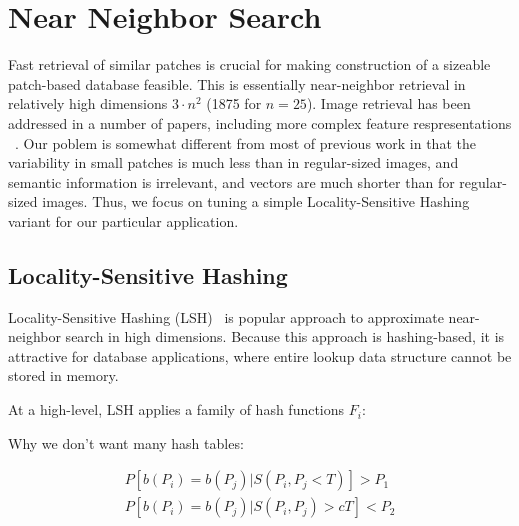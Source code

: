\section{Near Neighbor Search}\label{sec:nn}

Fast retrieval of similar patches is crucial for making
construction of a sizeable patch-based database feasible.
This is essentially near-neighbor retrieval in
relatively high dimensions $3 \cdot n^2$ (1875 for $n=25$).
Image retrieval has been addressed in a number of papers,
including more complex feature respresentations ~\cite{perronnin2010large}.
Our poblem is somewhat different from most of previous work
in that the variability
in small patches is much less than in regular-sized images,
and semantic information is irrelevant, and vectors are much shorter
than for regular-sized images.
Thus, we focus on tuning
a simple Locality-Sensitive Hashing variant for our
particular application.

\subsection{Locality-Sensitive Hashing}

Locality-Sensitive Hashing (LSH)~\cite{LSH:Andoni}
is popular approach to approximate near-neighbor search
in high dimensions.
Because this approach is hashing-based, it is
attractive for database applications, where entire lookup data structure
cannot be stored in memory.

At a high-level, LSH applies a family of hash functions $F_i$:

Why we don't want many hash tables:

\begin{equation*}
\begin{aligned}
P[b(P_i) = b(P_j) | S(P_i, P_j < T)] > P_1\\
P[b(P_i) = b(P_j) | S(P_i, P_j) > cT] < P_2
\end{aligned}
\end{equation*}

